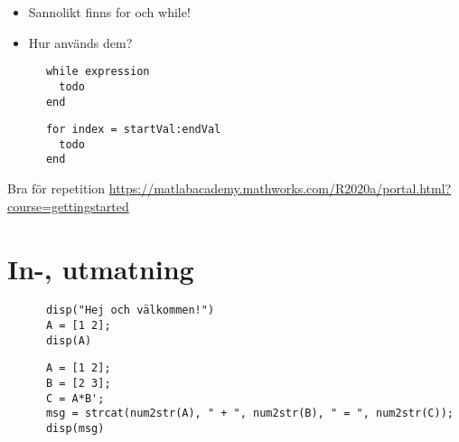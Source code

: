 \begin{frame}[fragile]
  \begin{exercise}
    \begin{itemize}
      \item Sannolikt finns for och while!
      \item Hur används dem?
    \end{itemize}
  \end{exercise}

  \pause

  \begin{example}[while]
    \begin{verbatim}
      while expression
        todo
      end
    \end{verbatim}
  \end{example}

  \begin{example}[for]
    \begin{verbatim}
      for index = startVal:endVal
        todo
      end
    \end{verbatim}
  \end{example}
\end{frame}

\begin{frame}
  \begin{block}{Bra för repetition}
    \url{https://matlabacademy.mathworks.com/R2020a/portal.html?course=gettingstarted}
  \end{block}
\end{frame}


\section{In-, utmatning}

\begin{frame}[fragile]
  \begin{example}[Utmatning]
    \begin{verbatim}
      disp("Hej och välkommen!")
      A = [1 2];
      disp(A)
    \end{verbatim}
  \end{example}
\end{frame}

\begin{frame}[fragile]
  \begin{example}[Strängar]
    \begin{verbatim}
      A = [1 2];
      B = [2 3];
      C = A*B';
      msg = strcat(num2str(A), " + ", num2str(B), " = ", num2str(C));
      disp(msg)
    \end{verbatim}
  \end{example}
\end{frame}

